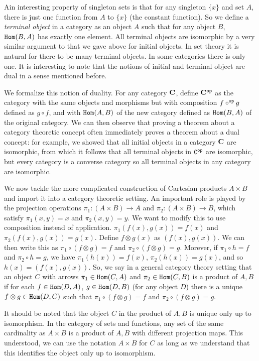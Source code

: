\documentclass[12pt]{article}
\begin{document}
Ain interesting property of singleton sets is that for any singleton $\{x\}$ and set $A$, there is just one function from $A$ to $\{x\}$ (the constant function).  So we define a {\em terminal object\/} in a category as an object $A$ such that for any object $B$, ${\tt Hom}(B,A)$ has exactly one element.
All terminal objects are isomorphic by a very similar argument to that we gave above for initial objects.  In set theory it is natural for there to be many terminal objects.  In some categories there is only one.  It is interesting to note that the notions of initial and terminal object are dual in a sense mentioned before.

We formalize this notion of duality.  For any category ${\bf C}$, define ${\bf C^{\tt op}}$ as the category with the same objects and morphisms but with composition $f \circ^{\tt op} g$ defined as $g \circ f$, and with ${\tt Hom}(A,B)$ of the new category defined as ${\tt Hom}(B,A)$ of the original category.  We can then observe that proving a theorem about a category theoretic concept often immediately proves a theorem about a dual concept:  for example, we showed that all initial objects in a category ${\bf C}$ are isomorphic, from which it follows that all terminal objects in ${\tt C^{\tt op}}$ are isomorphic, but every category is a converse category so all terminal objects in any category are isomorphic.

We now tackle the more complicated construction of Cartesian products $A \times B$ and import it into a category theoretic setting.  An important role is played by the projection operations $\pi_1:(A \times B) \rightarrow A$ and $\pi_2:(A \times B) \rightarrow B$, which satisfy
$\pi_1(x,y) = x$ and $\pi_2(x,y) = y$.  We want to modify this to use composition instead of application.  $\pi_1(f(x),g(x)) = f(x)$ and $\pi_2(f(x),g(x)) = g(x)$.  Define $f \otimes g(x)$ as $(f(x),g(x))$.  We can then write this as $\pi_1\circ(f \otimes g) = f$ and
$\pi_2 \circ (f \otimes g) = g$.  Morever, if $\pi_1\circ h = f$ and $\pi_2\circ h = g$, we have $\pi_1(h(x)) = f(x)$, $\pi_2(h(x)) = g(x)$, and so $h(x) = (f(x),g(x))$.  So, we say in a general category theory setting that an object $C$ with arrows $\pi_1 \in {\tt Hom}(C,A)$ and
$\pi_2 \in {\tt Hom}(C,B)$ is a product of $A,B$ if for each $f \in {\tt Hom}(D,A)$, $g \in {\tt Hom}(D,B)$ (for any object $D$) there is a unique $f \otimes g \in {\tt Hom}(D,C)$ such that $\pi_1 \circ (f \otimes g) = f$ and $\pi_2 \circ (f \otimes g) = g$.

It should be noted that the object $C$ in the product of $A,B$ is unique only up to isomorphism.  In the category of sets and functions, any set of the same cardinality as $A \times B$ is a product of $A,B$ with different projection maps.  This understood, we can use the notation $A \times B$ for
$C$ as long as we understand that this identifies the object only up to isomorphism.
\end{document}

